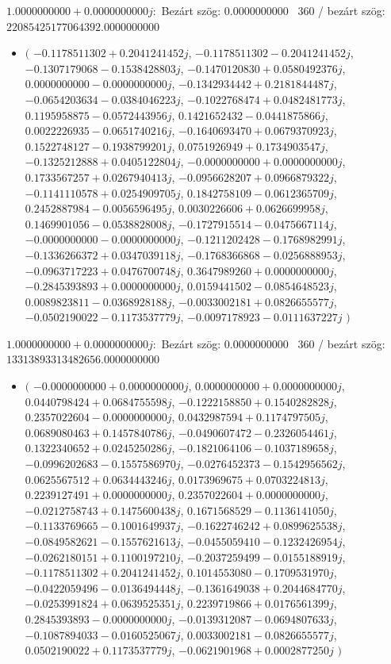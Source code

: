 \documentclass[14pt,a4paper]{article}
\begin{document}
$1.0000000000+0.0000000000j$:\
Bezárt szög: $0.0000000000$ \
360 / bezárt szög: $22085425177064392.0000000000$\
\begin{itemize}
\item
$\big($
$-0.1178511302+0.2041241452j$, $-0.1178511302-0.2041241452j$, $-0.1307179068-0.1538428803j$, $-0.1470120830+0.0580492376j$, $0.0000000000-0.0000000000j$, $-0.1342934442+0.2181844487j$, $-0.0654203634-0.0384046223j$, $-0.1022768474+0.0482481773j$, $0.1195958875-0.0572443956j$, $0.1421652432-0.0441875866j$, $0.0022226935-0.0651740216j$, $-0.1640693470+0.0679370923j$, $0.1522748127-0.1938799201j$, $0.0751926949+0.1734903547j$, $-0.1325212888+0.0405122804j$, $-0.0000000000+0.0000000000j$, $0.1733567257+0.0267940413j$, $-0.0956628207+0.0966879322j$, $-0.1141110578+0.0254909705j$, $0.1842758109-0.0612365709j$, $0.2452887984-0.0056596495j$, $0.0030226606+0.0626699958j$, $0.1469901056-0.0538828008j$, $-0.1727915514-0.0475667114j$, $-0.0000000000-0.0000000000j$, $-0.1211202428-0.1768982991j$, $-0.1336266372+0.0347039118j$, $-0.1768366868-0.0256888953j$, $-0.0963717223+0.0476700748j$, $0.3647989260+0.0000000000j$, $-0.2845393893+0.0000000000j$, $0.0159441502-0.0854648523j$, $0.0089823811-0.0368928188j$, $-0.0033002181+0.0826655577j$, $-0.0502190022-0.1173537779j$, $-0.0097178923-0.0111637227j$
$\big)$
\end{itemize}
$1.0000000000+0.0000000000j$:\
Bezárt szög: $0.0000000000$ \
360 / bezárt szög: $13313893313482656.0000000000$\
\begin{itemize}
\item
$\big($
$-0.0000000000+0.0000000000j$, $0.0000000000+0.0000000000j$, $0.0440798424+0.0684755598j$, $-0.1222158850+0.1540282828j$, $0.2357022604-0.0000000000j$, $0.0432987594+0.1174797505j$, $0.0689080463+0.1457840786j$, $-0.0490607472-0.2326054461j$, $0.1322340652+0.0245250286j$, $-0.1821064106-0.1037189658j$, $-0.0996202683-0.1557586970j$, $-0.0276452373-0.1542956562j$, $0.0625567512+0.0634443246j$, $0.0173969675+0.0703224813j$, $0.2239127491+0.0000000000j$, $0.2357022604+0.0000000000j$, $-0.0212758743+0.1475600438j$, $0.1671568529-0.1136141050j$, $-0.1133769665-0.1001649937j$, $-0.1622746242+0.0899625538j$, $-0.0849582621-0.1557621613j$, $-0.0455059410-0.1232426954j$, $-0.0262180151+0.1100197210j$, $-0.2037259499-0.0155188919j$, $-0.1178511302+0.2041241452j$, $0.1014553080-0.1709531970j$, $-0.0422059496-0.0136494448j$, $-0.1361649038+0.2044684770j$, $-0.0253991824+0.0639525351j$, $0.2239719866+0.0176561399j$, $0.2845393893-0.0000000000j$, $-0.0139312087-0.0694807633j$, $-0.1087894033-0.0160525067j$, $0.0033002181-0.0826655577j$, $0.0502190022+0.1173537779j$, $-0.0621901968+0.0002877250j$
$\big)$
\end{itemize}
\end{document}
